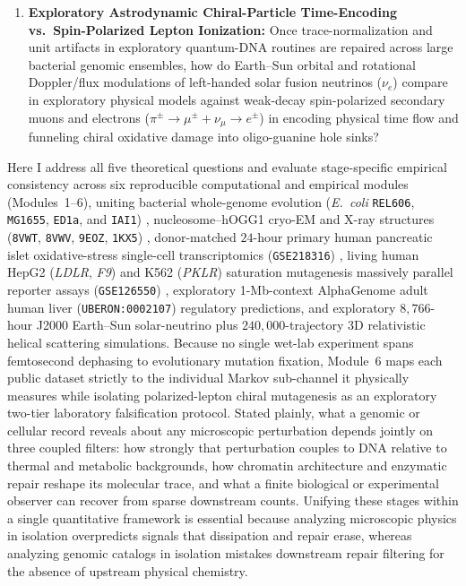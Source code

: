 \documentclass[10pt,letterpaper]{article}
\theoremstyle{plain}
\theoremstyle{definition}
\begin{document}
\begin{enumerate}[leftmargin=1.8em,itemsep=2pt]
    \item \textbf{Exploratory Astrodynamic Chiral-Particle Time-Encoding vs.\ Spin-Polarized Lepton Ionization:} Once trace-normalization and unit artifacts in exploratory quantum-DNA routines \cite{garcia2026dna} are repaired across large bacterial genomic ensembles, how do Earth--Sun orbital and rotational Doppler/flux modulations of left-handed solar fusion neutrinos ($\nu_e$) compare in exploratory physical models against weak-decay spin-polarized secondary muons and electrons ($\pi^\pm \to \mu^\pm + \nu_\mu \to e^\pm$) \cite{globus2020apjl,globus2021apj,appel2022borexino} in encoding physical time flow and funneling chiral oxidative damage into oligo-guanine hole sinks?
\end{enumerate}

Here I address all five theoretical questions and evaluate stage-specific empirical consistency across six reproducible computational and empirical modules (Modules~1--6), uniting bacterial whole-genome evolution (\emph{E.\ coli} \texttt{REL606}, \texttt{MG1655}, \texttt{ED1a}, and \texttt{IAI1}) \cite{tenaillon2016nature,chu2018bmcevol,foster2015pnas,garushyants2024gbe}, nucleosome--hOGG1 cryo-EM and X-ray structures (\texttt{8VWT}, \texttt{8VWV}, \texttt{9EOZ}, \texttt{1KX5}) \cite{ren2024natcommun,cordero2024natcommun}, donor-matched $24$-hour primary human pancreatic islet oxidative-stress single-cell transcriptomics (\texttt{GSE218316}) \cite{thomaidou2023diabetologia}, living human HepG2 (\emph{LDLR}, \emph{F9}) and K562 (\emph{PKLR}) saturation mutagenesis massively parallel reporter assays (\texttt{GSE126550}) \cite{kircher2019natcommun}, exploratory 1-Mb-context AlphaGenome adult human liver (\texttt{UBERON:0002107}) regulatory predictions, and exploratory $8{,}766$-hour J2000 Earth--Sun solar-neutrino plus $240{,}000$-trajectory 3D relativistic helical scattering simulations. Because no single wet-lab experiment spans femtosecond dephasing to evolutionary mutation fixation, Module~6 maps each public dataset strictly to the individual Markov sub-channel it physically measures while isolating polarized-lepton chiral mutagenesis as an exploratory two-tier laboratory falsification protocol. Stated plainly, what a genomic or cellular record reveals about any microscopic perturbation depends jointly on three coupled filters: how strongly that perturbation couples to DNA relative to thermal and metabolic backgrounds, how chromatin architecture and enzymatic repair reshape its molecular trace, and what a finite biological or experimental observer can recover from sparse downstream counts. Unifying these stages within a single quantitative framework is essential because analyzing microscopic physics in isolation overpredicts signals that dissipation and repair erase, whereas analyzing genomic catalogs in isolation mistakes downstream repair filtering for the absence of upstream physical chemistry.
\end{document}
